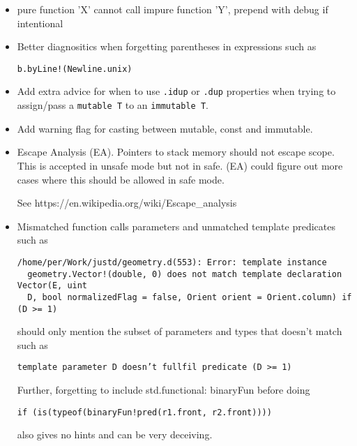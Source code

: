 \documentclass[xcolor=dvipsnames, twocolumn]{article}
\begin{document}
\begin{itemize}

\item pure function 'X' cannot call impure function 'Y', prepend with debug if intentional

\item Better diagnositics when forgetting parentheses in expressions such as

\begin{lstlisting}[frame=single]
b.byLine!(Newline.unix)
\end{lstlisting}

\item Add extra advice for when to use \texttt{.idup} or \texttt{.dup}
  properties when trying to assign/pass a \texttt{mutable T} to an
  \texttt{immutable T}.

\item Add warning flag for casting between mutable, const and immutable.

\item Escape Analysis (EA). Pointers to stack memory should not escape scope. This is
  accepted in unsafe mode but not in safe. (EA) could figure out more
  cases where this should be allowed in safe mode.

See https://en.wikipedia.org/wiki/Escape_analysis

\item Mismatched function calls parameters and unmatched template predicates such as

\begin{lstlisting}[frame=single]
/home/per/Work/justd/geometry.d(553): Error: template instance
  geometry.Vector!(double, 0) does not match template declaration Vector(E, uint
  D, bool normalizedFlag = false, Orient orient = Orient.column) if (D >= 1)
\end{lstlisting}

should only mention the subset of parameters and types that doesn't match such as

\begin{lstlisting}[frame=single]
template parameter D doesn’t fullfil predicate (D >= 1)
\end{lstlisting}

Further, forgetting to include std.functional: binaryFun before doing
\begin{lstlisting}[frame=single]
if (is(typeof(binaryFun!pred(r1.front, r2.front))))
\end{lstlisting}
also gives no hints and can be very deceiving.


\end{itemize}
\end{document}
